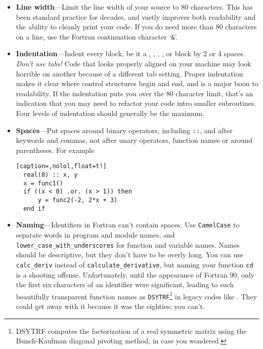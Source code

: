 \begin{itemize}
  \item\textbf{Line width}---Limit the line width of your source to 80 characters.
    This has been standard practice for decades, and vastly improves both readability and the ability to cleanly print your code.
    If you do need more than 80 characters on a line, use the Fortran continuation character `\texttt{\&}'.
  \item\textbf{Indentation}---Indent every block, be it  a , , \linebreak {}, ,  or  block by 2 or 4 spaces.
    \emph{Don't use tabs!} Code that looks properly aligned on your machine may look horrible on another because of a different tab setting.
    Proper indentation makes it clear where control structures begin and end, and is a major boon to readability.
    If the indentation puts you over the 80 character limit, that's an indication that you may need to refactor your code intro smaller subroutines.
    Four levels of indentation should generally be the maximum.
  \item\textbf{Spaces}---Put spaces around binary operators, including \texttt{::}, and after keywords and commas, not after unary operators, function names or around parentheses. For example
\begin{lstlisting}[caption=,nolol,float=t!]
  real(8) :: x, y
  x = func1()
  if ((x < 0) .or. (x > 1)) then
      y = func2(-2, 2*x + 3)
  end if
\end{lstlisting}
  \item\textbf{Naming}---Identifiers in Fortran can't contain spaces.
    Use \linebreak \texttt{CamelCase} to separate words in program and module names, and \linebreak \texttt{lower\_case\_with\_underscores} for function and variable names.
    Names should be descriptive, but they don't have to be overly long.
    You can use \texttt{calc\_deriv} instead of \texttt{calculate\_derivative}, but naming your function \texttt{cd} is a shooting offense.
    Unfortunately, until the appearance of Fortran 90, only the first six characters of an identifier were significant, leading to such beautifully transparent function names as \texttt{DSYTRF}\footnote{DSYTRF computes the factorization of a real symmetric matrix using the Bunch-Kaufman diagonal pivoting method, in case you wondered.} in legacy codes like .
    They could get away with it because it was the eighties; you can't.

\end{itemize}
